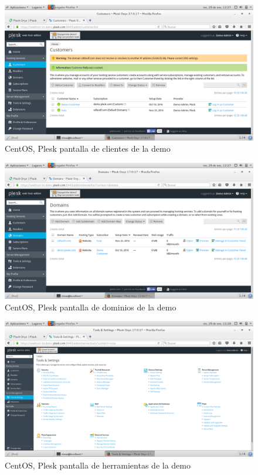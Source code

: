 \begin{figure}[H] 
	\centering
	\includegraphics[width=15cm]{./img/ejercicio14_2.png} 	
	\caption{CentOS, Plesk pantalla de clientes de la demo} \label{fig:ejercicio14_2}
\end{figure}

\begin{figure}[H] 
	\centering
	\includegraphics[width=15cm]{./img/ejercicio14_3.png} 	
	\caption{CentOS, Plesk pantalla de dominios de la demo} \label{fig:ejercicio14_3}
\end{figure}

\begin{figure}[H] 
	\centering
	\includegraphics[width=15cm]{./img/ejercicio14_4.png} 	
	\caption{CentOS, Plesk pantalla de herramientas de la demo} \label{fig:ejercicio14_4}
\end{figure}

